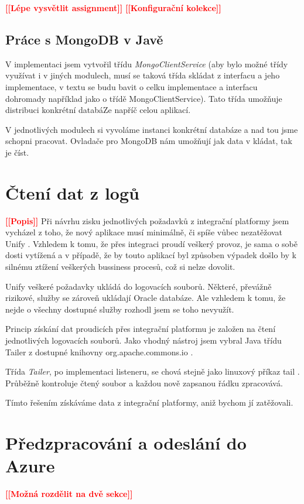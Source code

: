 \documentclass[thesis=M,czech]{FITthesis}[2012/10/20]
\newcommand{\todo}[1]{\textcolor{red}{\textbf{[[#1]]}}}
\begin{document}
		\todo{Lépe vysvětlit assignment}
		\todo{Konfigurační kolekce}
		
		\subsection{Práce s MongoDB v Javě}
		V implementaci jsem vytvořil třídu \textit{MongoClientService} (aby bylo možné třídy využívat i v jiných modulech, musí se taková třída skládat z interfacu a jeho implementace, v textu se budu bavit o celku implementace a interfacu dohromady například jako o třídě MongoClientService). Tato třída umožňuje distribuci konkrétní databáZe napříč celou aplikací. 
		
		V jednotlivých modulech si vyvoláme instanci konkrétní databáze a nad tou jsme schopni pracovat. Ovladače pro MongoDB nám umožňují jak data v kládat, tak je číst.
		
		
		
		
	\section{Čtení dat z logů}
		\todo{Popis}				
		Při návrhu zisku jednotlivých požadavků z integrační platformy jsem vycházel z toho, že nový aplikace musí minimálně, či spíše vůbec nezatěžovat Unify \cite{unify}. Vzhledem k tomu, že přes integraci proudí veškerý provoz, je sama o sobě dosti vytížená a v případě, že by touto aplikací byl způsoben výpadek došlo by k silnému ztížení veškerých bussiness procesů, což si nelze dovolit.
		
		Unify veškeré požadavky ukládá do logovacích souborů. Některé, převážně rizikové, služby se zároveň ukládají Oracle databáze. Ale vzhledem k tomu, že nejde o všechny dostupné služby rozhodl jsem se toho nevyužít.
		
		Princip získání dat proudicích přes integrační platformu je založen na čtení jednotlivých logovacích souborů. Jako vhodný nástroj jsem vybral Java třídu Tailer z dostupné knihovny org.apache.commons.io \cite{tailerClass}.
		
		Třída \textit{Tailer}, po implementaci listeneru, se chová stejně jako linuxový příkaz tail \cite{tailLinux}. Průběžně kontroluje čtený soubor a každou nově zapsanou řádku zpracovává.
		
		Tímto řešením získáváme data z integrační platformy, aniž bychom jí zatěžovali. 
		
	\section{Předzpracování a odeslání do Azure}
		\label{sec:send_to_azure}
		\todo{Možná rozdělit na dvě sekce}
		
\end{document}
